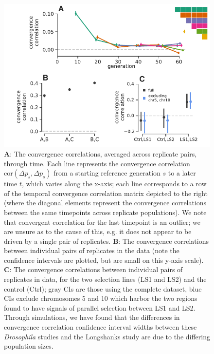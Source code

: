 \documentclass[11pt]{article}
\begin{document}
\begin{figure}[!htb]
  \centering
  \includegraphics[width=\textwidth]{figures/figure-2-revision.pdf}

  \caption{{\bf A}: The convergence correlations, averaged across
    \textcite{Barghi2019-qy} replicate pairs, through time. Each line
    represents the convergence correlation $\mathrm{cor}(\Delta p_{s}, \Delta
    p_{s})$ from a starting reference generation $s$ to a later time $t$, which
    varies along the x-axis; each line corresponds to a row of the temporal
    convergence correlation matrix depicted to the right (where the
      diagonal elements represent the convergence correlations between the same
      timepoints across replicate populations). We note that convergent
      correlation for the last timepoint is an outlier; we are unsure as to the
      cause of this, e.g. it does not appear to be driven by a single pair of
      replicates. {\bf B}: The convergence correlations between individual
      pairs of replicates in the \textcite{Kelly2019-dc} data (note the
      confidence intervals are plotted, but are small on this y-axis scale).
      {\bf C}:  The convergence correlations between individual pairs of
      replicates in \parencite{Castro2019-uk} data, for the two selection lines
      (LS1 and LS2) and the control (Ctrl); gray CIs are those using the
      complete dataset, blue CIs exclude chromosomes 5 and 10 which harbor the
      two regions \textcite{Castro2019-uk} found to have signals of parallel
      selection between LS1 and LS2. Through simulations, we have found
        that the differences in convergence correlation confidence interval
        widths between these \emph{Drosophila} studies and the Longshanks study
        are due to the differing population sizes.}

  \label{fig:figure-2}
\end{figure}
\end{document}
